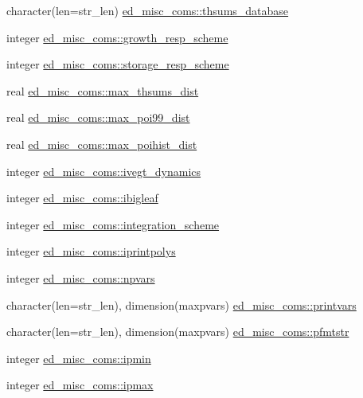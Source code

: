 \begin{DoxyCompactItemize}
\item 
character(len=str\+\_\+len) \hyperlink{namespaceed__misc__coms_a2c12061ad27449088c196919983f9223}{ed\+\_\+misc\+\_\+coms\+::thsums\+\_\+database}
\item 
integer \hyperlink{namespaceed__misc__coms_a2f9e6633548e93a1f2048a735a869e64}{ed\+\_\+misc\+\_\+coms\+::growth\+\_\+resp\+\_\+scheme}
\item 
integer \hyperlink{namespaceed__misc__coms_adfd6a78f48460401459b4ead628dcd5e}{ed\+\_\+misc\+\_\+coms\+::storage\+\_\+resp\+\_\+scheme}
\item 
real \hyperlink{namespaceed__misc__coms_abbfd8a19f7457ca2dac25ee1b7320698}{ed\+\_\+misc\+\_\+coms\+::max\+\_\+thsums\+\_\+dist}
\item 
real \hyperlink{namespaceed__misc__coms_abc96ae7c134acec3af4ad1d3f5fb0c93}{ed\+\_\+misc\+\_\+coms\+::max\+\_\+poi99\+\_\+dist}
\item 
real \hyperlink{namespaceed__misc__coms_a901f08dcd64adce4205961137790e4ce}{ed\+\_\+misc\+\_\+coms\+::max\+\_\+poihist\+\_\+dist}
\item 
integer \hyperlink{namespaceed__misc__coms_a21dc5569efa9865127c3085e8560e46d}{ed\+\_\+misc\+\_\+coms\+::ivegt\+\_\+dynamics}
\item 
integer \hyperlink{namespaceed__misc__coms_a1ae8a451acc598f43489c44b8eb16d4d}{ed\+\_\+misc\+\_\+coms\+::ibigleaf}
\item 
integer \hyperlink{namespaceed__misc__coms_ab8951beb1912e4b3c3fc4be49b315cf1}{ed\+\_\+misc\+\_\+coms\+::integration\+\_\+scheme}
\item 
integer \hyperlink{namespaceed__misc__coms_af706beac09d172fc210941e0f536ec8f}{ed\+\_\+misc\+\_\+coms\+::iprintpolys}
\item 
integer \hyperlink{namespaceed__misc__coms_a6dcd08f6c29a21f22660d1dcb7897ab7}{ed\+\_\+misc\+\_\+coms\+::npvars}
\item 
character(len=str\+\_\+len), dimension(maxpvars) \hyperlink{namespaceed__misc__coms_abeda9131f5dae12b63b8d2521319f87d}{ed\+\_\+misc\+\_\+coms\+::printvars}
\item 
character(len=str\+\_\+len), dimension(maxpvars) \hyperlink{namespaceed__misc__coms_aed54f9188bbb97c53b47547c92b42e8c}{ed\+\_\+misc\+\_\+coms\+::pfmtstr}
\item 
integer \hyperlink{namespaceed__misc__coms_a36b003939acbea3d21a3c5bcba10e01d}{ed\+\_\+misc\+\_\+coms\+::ipmin}
\item 
integer \hyperlink{namespaceed__misc__coms_af80ae2bbe024585e70d98c52bc5036bd}{ed\+\_\+misc\+\_\+coms\+::ipmax}

\end{DoxyCompactItemize}
